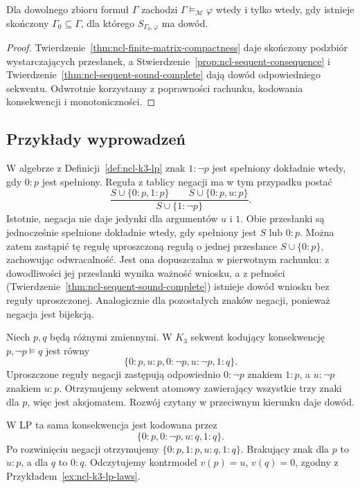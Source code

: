 \begin{wniosek}
\label{cor:ncl-sequent-compact}
Dla dowolnego zbioru formuł $\Gamma$ zachodzi
$\Gamma\models_{\mathcal M}\varphi$ wtedy i tylko wtedy,
gdy istnieje skończony $\Gamma_0\subseteq\Gamma$,
dla którego $S_{\Gamma_0,\varphi}$ ma dowód.
\end{wniosek}
\begin{proof}
Twierdzenie~\ref{thm:ncl-finite-matrix-compactness}
daje skończony podzbiór wystarczających przesłanek,
a Stwierdzenie~\ref{prop:ncl-sequent-consequence}
i Twierdzenie~\ref{thm:ncl-sequent-sound-complete}
dają dowód odpowiedniego sekwentu.
Odwrotnie korzystamy z poprawności rachunku,
kodowania konsekwencji i monotoniczności.
\end{proof}

\subsection{Przykłady wyprowadzeń}
\begin{przyklad}
\label{ex:ncl-sequent-kleene-negation}
W algebrze z Definicji~\ref{def:ncl-k3-lp}
znak $1:\neg p$ jest spełniony dokładnie wtedy,
gdy $0:p$ jest spełniony. Reguła z tablicy negacji
ma w tym przypadku postać
\[
\frac{S\cup\{0:p,1:p\}\qquad
      S\cup\{0:p,u:p\}}
     {S\cup\{1:\neg p\}}.
\]
Istotnie, negacja nie daje jedynki dla argumentów
$u$ i $1$. Obie przesłanki są jednocześnie spełnione
dokładnie wtedy, gdy spełniony jest $S$ lub $0:p$.
Można zatem zastąpić tę regułę uproszczoną regułą
o jednej przesłance $S\cup\{0:p\}$, zachowując
odwracalność. Jest ona dopuszczalna w pierwotnym
rachunku: z dowodliwości jej przesłanki wynika
ważność wniosku, a z pełności
(Twierdzenie~\ref{thm:ncl-sequent-sound-complete})
istnieje dowód wniosku bez reguły uproszczonej.
Analogicznie dla pozostałych znaków
negacji, ponieważ negacja jest bijekcją.
\end{przyklad}

\begin{przyklad}
\label{ex:ncl-sequent-explosion}
Niech $p,q$ będą różnymi zmiennymi.
W $K_3$ sekwent kodujący konsekwencję
$p,\neg p\models q$ jest równy
\[
 \{0:p,u:p,0:\neg p,u:\neg p,1:q\}.
\]
Uproszczone reguły negacji zastępują odpowiednio
$0:\neg p$ znakiem $1:p$, a $u:\neg p$ znakiem
$u:p$. Otrzymujemy sekwent atomowy zawierający
wszystkie trzy znaki dla $p$, więc jest aksjomatem.
Rozwój czytany w przeciwnym kierunku daje dowód.

W LP ta sama konsekwencja jest kodowana przez
\[
 \{0:p,0:\neg p,u:q,1:q\}.
\]
Po rozwinięciu negacji otrzymujemy
$\{0:p,1:p,u:q,1:q\}$.
Brakujący znak dla $p$ to $u:p$, a dla $q$ to $0:q$.
Odczytujemy kontrmodel $v(p)=u$, $v(q)=0$,
zgodny z Przykładem~\ref{ex:ncl-k3-lp-laws}.
\end{przyklad}

